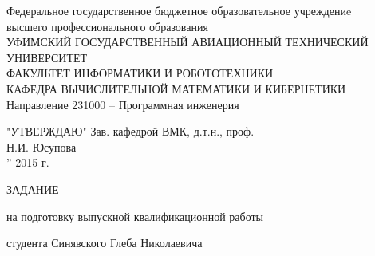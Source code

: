 \begin{titlepage}
\newpage

\begin{center}
Федеральное государственное бюджетное образовательное учреждениe\\
высшего профессионального образования \\
\vspace{0.5cm}
УФИМСКИЙ ГОСУДАРСТВЕННЫЙ АВИАЦИОННЫЙ ТЕХНИЧЕСКИЙ УНИВЕРСИТЕТ\\
\vspace{0.5cm}
ФАКУЛЬТЕТ  ИНФОРМАТИКИ  И  РОБОТОТЕХНИКИ \\
\vspace{0.5cm}
КАФЕДРА  ВЫЧИСЛИТЕЛЬНОЙ  МАТЕМАТИКИ  И  КИБЕРНЕТИКИ\\
\vspace{0.5cm}
Направление 231000 – Программная инженерия
\end{center}
\vspace{0.5cm}
\begin{flushright}
"УТВЕРЖДАЮ"
Зав. кафедрой  ВМК, д.т.н., проф.\\
\vspace{0.5cm}
\underline{\hspace{5cm}} Н.И. Юсупова\\
\underline{\hspace{1cm}}”\underline{\hspace{5cm}} 2015 г.
\end{flushright}
\vspace{1cm}

\begin{center}
  \Large{ ЗАДАНИЕ }
\vspace{0.5cm}

на подготовку выпускной квалификационной работы
\end{center}

студента Синявского Глеба Николаевича


\end{titlepage}
